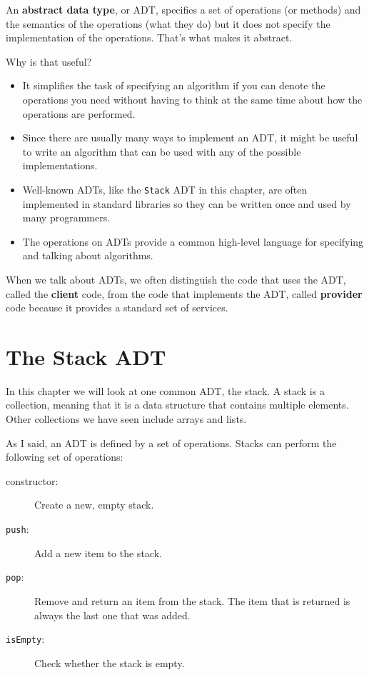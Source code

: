 An {\bf abstract data type}, or ADT, specifies a set of operations (or
methods) and the semantics of the operations (what they do) but it
does not specify the implementation of the operations.  That's
what makes it abstract.

Why is that useful?

\begin{itemize}

\item It simplifies the task of specifying an algorithm if you
can denote the operations you need without having to think at the
same time about how the operations are performed.

\item Since there are usually many ways to implement an ADT,
it might be useful to write an algorithm that can be used with
any of the possible implementations.

\item Well-known ADTs, like the {\tt Stack} ADT in this chapter,
are often implemented in standard libraries so they can be written
once and used by many programmers.

\item The operations on ADTs provide a common high-level language
for specifying and talking about algorithms.

\end{itemize}

When we talk about ADTs, we often distinguish the code that uses
the ADT, called the {\bf client} code, from the code that implements
the ADT, called {\bf provider} code because it provides a standard
set of services.



\section{The Stack ADT}

In this chapter we will look at one common ADT, the stack.  A
stack is a collection, meaning that it is a data structure that
contains multiple elements.  Other collections we have seen include
arrays and lists.

As I said, an ADT is defined by a set of operations.
Stacks can perform the following set of operations:

\begin{description}

\item[constructor:] Create a new, empty stack.

\item[{\tt push}:] Add a new item to the stack.

\item[{\tt pop}:] Remove and return an item from the stack.  The item
that is returned is always the last one that was added.

\item[{\tt isEmpty}:] Check whether the stack is empty.

\end{description}

